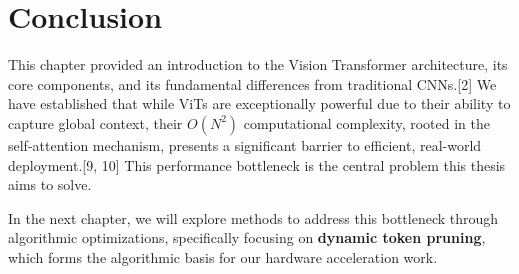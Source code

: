 \section{Conclusion}
This chapter provided an introduction to the Vision Transformer architecture, its core components, and its fundamental differences from traditional CNNs.[2] We have established that while ViTs are exceptionally powerful due to their ability to capture global context, their $O(N^2)$ computational complexity, rooted in the self-attention mechanism, presents a significant barrier to efficient, real-world deployment.[9, 10]
This performance bottleneck is the central problem this thesis aims to solve.

In the next chapter, we will explore methods to address this bottleneck through algorithmic optimizations, specifically focusing on \textbf{dynamic token pruning}, which forms the algorithmic basis for our hardware acceleration work.